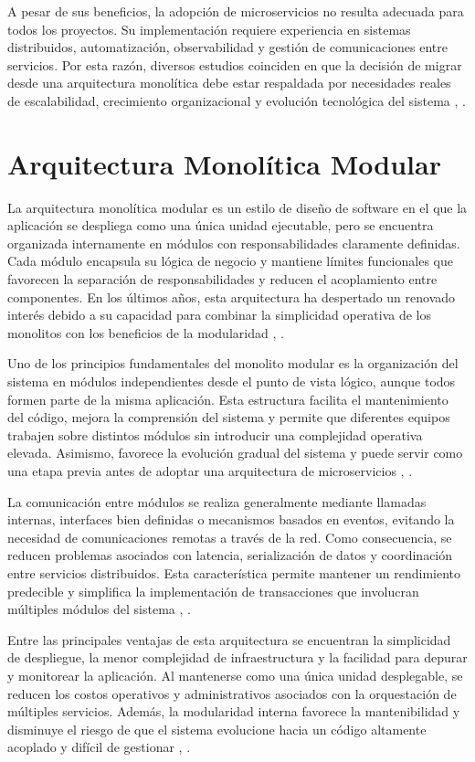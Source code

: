 \documentclass[10pt,conference]{IEEEtran}
\begin{document}
A pesar de sus beneficios, la adopción de microservicios no resulta adecuada para todos los proyectos. Su implementación requiere experiencia en sistemas distribuidos, automatización, observabilidad y gestión de comunicaciones entre servicios. Por esta razón, diversos estudios coinciden en que la decisión de migrar desde una arquitectura monolítica debe estar respaldada por necesidades reales de escalabilidad, crecimiento organizacional y evolución tecnológica del sistema \cite{ref10}, \cite{ref17}.

\section{Arquitectura Monolítica Modular}
La arquitectura monolítica modular es un estilo de diseño de software en el que la aplicación se despliega como una única unidad ejecutable, pero se encuentra organizada internamente en módulos con responsabilidades claramente definidas. Cada módulo encapsula su lógica de negocio y mantiene límites funcionales que favorecen la separación de responsabilidades y reducen el acoplamiento entre componentes. En los últimos años, esta arquitectura ha despertado un renovado interés debido a su capacidad para combinar la simplicidad operativa de los monolitos con los beneficios de la modularidad \cite{ref18}, \cite{ref19}.

Uno de los principios fundamentales del monolito modular es la organización del sistema en módulos independientes desde el punto de vista lógico, aunque todos formen parte de la misma aplicación. Esta estructura facilita el mantenimiento del código, mejora la comprensión del sistema y permite que diferentes equipos trabajen sobre distintos módulos sin introducir una complejidad operativa elevada. Asimismo, favorece la evolución gradual del sistema y puede servir como una etapa previa antes de adoptar una arquitectura de microservicios \cite{ref18}, \cite{ref20}.

La comunicación entre módulos se realiza generalmente mediante llamadas internas, interfaces bien definidas o mecanismos basados en eventos, evitando la necesidad de comunicaciones remotas a través de la red. Como consecuencia, se reducen problemas asociados con latencia, serialización de datos y coordinación entre servicios distribuidos. Esta característica permite mantener un rendimiento predecible y simplifica la implementación de transacciones que involucran múltiples módulos del sistema \cite{ref21}, \cite{ref20}.

Entre las principales ventajas de esta arquitectura se encuentran la simplicidad de despliegue, la menor complejidad de infraestructura y la facilidad para depurar y monitorear la aplicación. Al mantenerse como una única unidad desplegable, se reducen los costos operativos y administrativos asociados con la orquestación de múltiples servicios. Además, la modularidad interna favorece la mantenibilidad y disminuye el riesgo de que el sistema evolucione hacia un código altamente acoplado y difícil de gestionar \cite{ref18}, \cite{ref21}.
\end{document}
